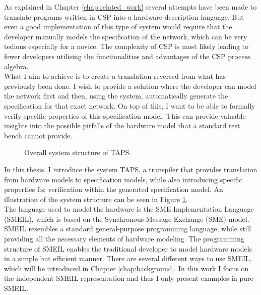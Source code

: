 As explained in Chapter \ref{chap:related_work} several attempts have been made to translate programs written in CSP into a hardware description language. But even a good implementation of this type of system would require that the developer manually models the specification of the \cspm{} network, which can be very tedious especially for a novice.
The complexity of CSP is most likely leading to fewer developers utilising the functionalities and advantages of the CSP process algebra.\\

What I aim to achieve is to create a translation reversed from what has previously been done. I wish to provide a solution where the developer can model the network first and then, using the system, automatically generate the specification for that exact network. On top of this, I want to be able to formally verify specific properties of this specification model. This can provide valuable insights into the possible pitfalls of the hardware model that a standard test bench cannot provide.\\
\begin{figure}[!ht]
  \centering
  \caption{Overall system structure of TAPS.}
  \label{fig:simple_TAPS_network}
\end{figure}
In this thesis, I introduce the system TAPS, a transpiler that provides translation from hardware models to specification models, while also introducing specific properties for verification within the generated specification model. An illustration of the system structure can be seen in Figure \ref{fig:simple_TAPS_network}.\\

The language used to model the hardware is the SME Implementation Language (SMEIL), which is based on the Synchronous Message Exchange (SME) model. SMEIL resembles a standard general-purpose programming language, while still providing all the necessary elements of hardware modeling. The programming structure of SMEIL enables the traditional developer to model hardware models in a simple but efficient manner. There are several different ways to use SMEIL, which will be introduced in Chapter \ref{chap:background}. In this work I focus on the independent SMEIL representation and thus I only present examples in pure SMEIL. \\\\


